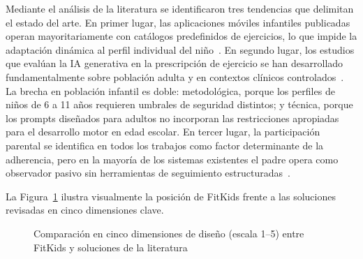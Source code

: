 			Mediante el análisis de la literatura se identificaron tres tendencias que delimitan el estado del arte. En primer lugar, las aplicaciones móviles infantiles publicadas operan mayoritariamente con catálogos predefinidos de ejercicios, lo que impide la adaptación dinámica al perfil individual del niño~\cite{Zhang2024,Papastergiou2021,Willinger2024,Wunsch2024}. En segundo lugar, los estudios que evalúan la IA generativa en la prescripción de ejercicio se han desarrollado fundamentalmente sobre población adulta y en contextos clínicos controlados~\cite{Zaleski2026,Dergaa2024,Pareek2025}. La brecha en población infantil es doble: metodológica, porque los perfiles de niños de 6 a 11 años requieren umbrales de seguridad distintos; y técnica, porque los prompts diseñados para adultos no incorporan las restricciones apropiadas para el desarrollo motor en edad escolar. En tercer lugar, la participación parental se identifica en todos los trabajos como factor determinante de la adherencia, pero en la mayoría de los sistemas existentes el padre opera como observador pasivo sin herramientas de seguimiento estructuradas~\cite{Zhang2024,GomezCuesta2024,MateoOrcajada2024}.
			
			La Figura~\ref{fig:radar_comparativo} ilustra visualmente la posición de FitKids frente a las soluciones revisadas en cinco dimensiones clave.
			
			\begin{figure}[H]
				\centering
				\caption[Comparación en dimensiones de diseño entre FitKids y otras soluciones]{Comparación en cinco dimensiones de diseño (escala 1--5) entre FitKids y soluciones de la literatura~\cite{Willinger2024,Wunsch2024,GomezCuesta2024,MateoOrcajada2024}}
				\label{fig:radar_comparativo}
			\end{figure}
			\tblnote
			
